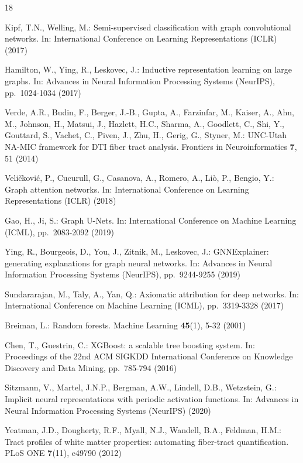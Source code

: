 \documentclass[runningheads]{llncs}
\begin{document}
\begin{thebibliography}{18}

Kipf, T.N., Welling, M.: Semi-supervised classification with graph convolutional
networks. In: International Conference on Learning Representations (ICLR) (2017)

Hamilton, W., Ying, R., Leskovec, J.: Inductive representation learning on large
graphs. In: Advances in Neural Information Processing Systems (NeurIPS),
pp.~1024-1034 (2017)

Verde, A.R., Budin, F., Berger, J.-B., Gupta, A., Farzinfar, M., Kaiser, A.,
Ahn, M., Johnson, H., Matsui, J., Hazlett, H.C., Sharma, A., Goodlett, C.,
Shi, Y., Gouttard, S., Vachet, C., Piven, J., Zhu, H., Gerig, G., Styner, M.:
UNC-Utah NA-MIC framework for DTI fiber tract analysis. Frontiers in
Neuroinformatics \textbf{7}, 51 (2014)

Veli\v{c}kovi\'c, P., Cucurull, G., Casanova, A., Romero, A., Li\`{o}, P.,
Bengio, Y.: Graph attention networks. In: International Conference on Learning
Representations (ICLR) (2018)

Gao, H., Ji, S.: Graph U-Nets. In: International Conference on Machine
Learning (ICML), pp.~2083-2092 (2019)

Ying, R., Bourgeois, D., You, J., Zitnik, M., Leskovec, J.: GNNExplainer:
generating explanations for graph neural networks. In: Advances in Neural
Information Processing Systems (NeurIPS), pp.~9244-9255 (2019)

Sundararajan, M., Taly, A., Yan, Q.: Axiomatic attribution for deep networks.
In: International Conference on Machine Learning (ICML), pp.~3319-3328 (2017)

Breiman, L.: Random forests. Machine Learning \textbf{45}(1), 5-32 (2001)

Chen, T., Guestrin, C.: XGBoost: a scalable tree boosting system. In:
Proceedings of the 22nd ACM SIGKDD International Conference on Knowledge
Discovery and Data Mining, pp.~785-794 (2016)

Sitzmann, V., Martel, J.N.P., Bergman, A.W., Lindell, D.B., Wetzstein, G.:
Implicit neural representations with periodic activation functions. In:
Advances in Neural Information Processing Systems (NeurIPS) (2020)

Yeatman, J.D., Dougherty, R.F., Myall, N.J., Wandell, B.A., Feldman, H.M.:
Tract profiles of white matter properties: automating fiber-tract quantification.
PLoS ONE \textbf{7}(11), e49790 (2012)


\end{thebibliography}
\end{document}
